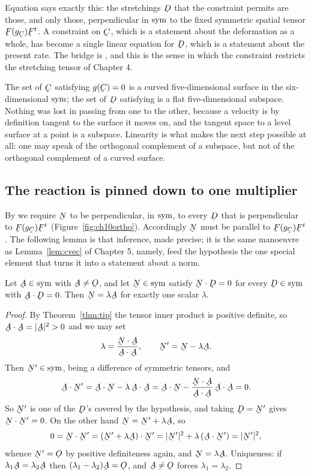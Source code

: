 Equation  says exactly this: the stretchings $\bD$ that the
constraint permits are those, and only those, perpendicular in $\operatorname{sym}$ to
the fixed symmetric spatial tensor $\bF(g_{\bC})\bF^{t}$. A constraint on
$\bC$, which is a statement about the deformation as a whole, has become
a single linear equation for $\bD$, which is a statement about the
present rate. The bridge is , and this is the sense in which
the constraint restricts the stretching tensor of Chapter 4.

\begin{remark}\label{rem:ch10lin}
The set of $\bC$ satisfying $g(\bC)=0$ is a curved five-dimensional
surface in the six-dimensional $\operatorname{sym}$; the set of $\bD$ satisfying
 is a flat five-dimensional subspace. Nothing was lost in
passing from one to the other, because a velocity is by definition
tangent to the surface it moves on, and the tangent space to a level
surface at a point is a subspace. Linearity is what makes the next step
possible at all: one may speak of the orthogonal complement of a
subspace, but not of the orthogonal complement of a curved surface.
\end{remark}

\subsection*{The reaction is pinned down to one multiplier}

By  we require $\bN$ to be perpendicular, in $\operatorname{sym}$, to every
$\bD$ that is perpendicular to $\bF(g_{\bC})\bF^{t}$
(Figure~\ref{fig:ch10ortho}). Accordingly $\bN$ must be parallel to
$\bF(g_{\bC})\bF^{t}$. The following lemma is that inference, made
precise; it is the same manoeuvre as Lemma~\ref{lem:cvec} of Chapter 5,
namely, feed the hypothesis the one special element that turns it into a
statement about a norm.

\begin{lemma}
\label{lem:ch10ortho}
Let $\bA\in\Sym$ with $\bA\neq\Ob$, and let $\bN\in\Sym$ satisfy
$\bN\cdot\bD=0$ for every $\bD\in\Sym$ with $\bA\cdot\bD=0$. Then
$\bN=\lambda\bA$ for exactly one scalar $\lambda$.
\end{lemma}

\begin{proof}
By Theorem~\ref{thm:tip} the tensor inner product is positive definite,
so $\bA\cdot\bA=|\bA|^{2}>0$ and we may set
\[
   \lambda=\frac{\bN\cdot\bA}{\bA\cdot\bA},\qquad
   \bN'=\bN-\lambda\bA .
\]
Then $\bN'\in\Sym$, being a difference of symmetric tensors, and
\[
   \bA\cdot\bN'=\bA\cdot\bN-\lambda\,\bA\cdot\bA
   =\bA\cdot\bN-\frac{\bN\cdot\bA}{\bA\cdot\bA}\,\bA\cdot\bA=0 .
\]
So $\bN'$ is one of the $\bD$'s covered by the hypothesis, and taking
$\bD=\bN'$ gives $\bN\cdot\bN'=0$. On the other hand
$\bN=\bN'+\lambda\bA$, so
\[
   0=\bN\cdot\bN'=(\bN'+\lambda\bA)\cdot\bN'
   =|\bN'|^{2}+\lambda\,(\bA\cdot\bN')=|\bN'|^{2},
\]
whence $\bN'=\Ob$ by positive definiteness again, and $\bN=\lambda\bA$.
Uniqueness: if $\lambda_{1}\bA=\lambda_{2}\bA$ then
$(\lambda_{1}-\lambda_{2})\bA=\Ob$, and $\bA\neq\Ob$ forces
$\lambda_{1}=\lambda_{2}$.
\end{proof}

